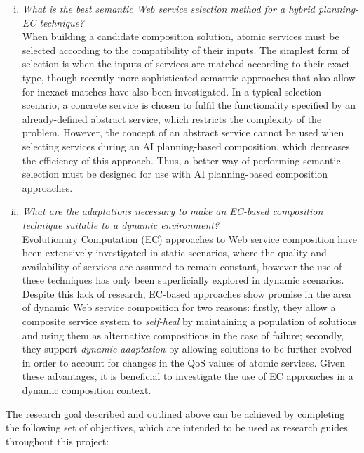 \begin{enumerate}[(i)]
\item \label{goal:semantic} \textit{What is the best semantic Web service selection method for a hybrid planning-EC technique?}\\
When building a candidate composition solution, atomic services must be selected according to the compatibility of their inputs. The simplest form of selection is when the inputs of services are matched according to their exact type, though recently more sophisticated semantic approaches that also allow for inexact matches have also been investigated. In a typical selection scenario, a concrete service is chosen to fulfil the functionality specified by an already-defined abstract service, which restricts the complexity of the problem. However, the concept of an abstract service cannot be used when selecting services during an AI planning-based composition, which decreases the efficiency of this approach. Thus, a better way of performing semantic selection must be designed for use with AI planning-based composition approaches.

\item \label{goal:dynamic} \textit{What are the adaptations necessary to make an EC-based composition technique suitable to a dynamic environment?}\\
Evolutionary Computation (EC) approaches to Web service composition have been extensively investigated in static scenarios, where the quality and availability of services are assumed to remain constant, however the use of these techniques has only been superficially explored in dynamic scenarios. Despite this lack of research, EC-based approaches show promise in the area of dynamic Web service composition for two reasons: firstly, they allow a composite service system to \textit{self-heal} by maintaining a population of solutions and using them as alternative compositions in the case of failure; secondly, they support \textit{dynamic adaptation} by allowing solutions to be further evolved in order to account for changes in the QoS values of atomic services. Given these advantages, it is beneficial to investigate the use of EC approaches in a dynamic composition context.

\end{enumerate}

The research goal described and outlined above can be achieved by completing the following set of objectives, which are intended to be used as research guides throughout this project:

